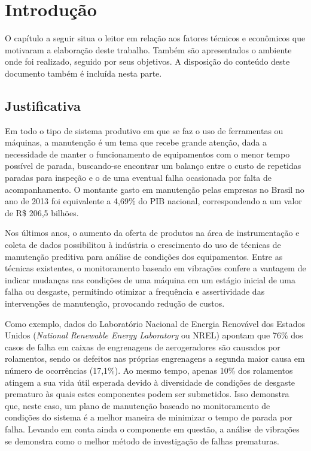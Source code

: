 \documentclass[12pt,openright,twoside,a4paper,
	chapter=TITLE,section=TITLE,
	english,brazil]{abntex2}
\begin{document}
	
	\textual %
	
	\chapter{Introdução}
	O capítulo a seguir situa o leitor em relação aos fatores técnicos e econômicos que motivaram a elaboração deste trabalho. Também são apresentados o ambiente onde foi realizado, seguido por seus objetivos. A disposição do conteúdo deste documento também é incluída nesta parte.
	
	\section{Justificativa}
	Em todo o tipo de sistema produtivo em que se faz o uso de ferramentas ou máquinas, a manutenção é um tema que recebe grande atenção, dada a necessidade de manter o funcionamento de equipamentos com o menor tempo possível de parada, buscando-se encontrar um balanço entre o custo de repetidas paradas para inspeção e o de uma eventual falha ocasionada por falta de acompanhamento. O montante gasto em manutenção pelas empresas no Brasil no ano de 2013 foi equivalente a 4,69\% do PIB nacional, correspondendo a um valor de R\$ 206,5 bilhões\cite{bib:seleme}.
	
	Nos últimos anos, o aumento da oferta de produtos na área de instrumentação e coleta de dados possibilitou à indústria o crescimento do uso de técnicas de manutenção preditiva para análise de condições dos equipamentos. Entre as técnicas existentes, o monitoramento baseado em vibrações confere a vantagem de indicar mudanças nas condições de uma máquina em um estágio inicial de uma falha ou desgaste\cite{bib:al-najjar}, permitindo otimizar a frequência e assertividade das intervenções de manutenção, provocando redução de custos.
	
	Como exemplo, dados do Laboratório Nacional de Energia Renovável dos Estados Unidos (\textit{National Renewable Energy Laboratory} ou NREL) apontam que 76\% dos casos de falha em caixas de engrenagens de aerogeradores são causados por rolamentos, sendo os defeitos nas próprias engrenagens a segunda maior causa em número de ocorrências (17,1\%). Ao mesmo tempo, apenas 10\% dos rolamentos atingem a sua vida útil esperada devido à diversidade de condições de desgaste prematuro às quais estes componentes podem ser submetidos\cite{bib:peeters}. Isso demonstra que, neste caso, um plano de manutenção baseado no monitoramento de condições do sistema é a melhor maneira de minimizar o tempo de parada por falha. Levando em conta ainda o componente em questão, a análise de vibrações se demonstra como o melhor método de investigação de falhas prematuras.
	
\end{document}
